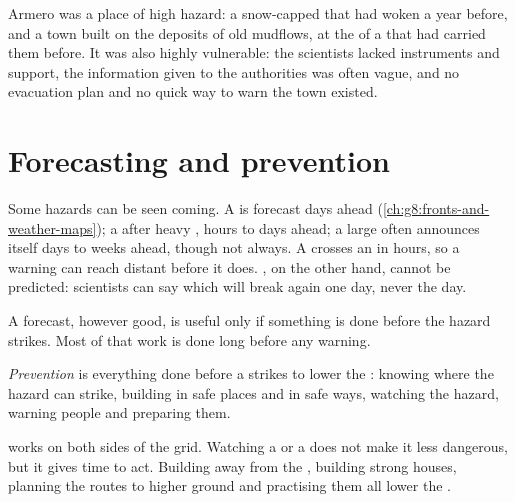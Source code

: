 Armero was a place of high hazard: a snow-capped  that had woken a
year before, and a town built on the deposits of old mudflows, at the
 of a  that had carried them before. It was also highly
vulnerable: the scientists lacked instruments and support, the
information given to the authorities was often vague, and no evacuation
plan and no quick way to warn the town existed.

\section{Forecasting and prevention}

Some hazards can be seen coming. A  is forecast days ahead
(\cref{ch:g8:fronts-and-weather-maps}); a  after heavy , hours
to days ahead; a large  often announces itself days to weeks
ahead, though not always. A  crosses an  in hours, so a
warning can reach distant  before it does. , on the
other hand, cannot be predicted: scientists can say which  will
break again one day, never the day.

A forecast, however good, is useful only if something is done before the
hazard strikes. Most of that work is done long before any warning.

\begin{definition}[Prevention]\label{def:g9:natural-risks:prevention}
\emph{Prevention} is everything done before a  strikes to lower the : knowing where the hazard can strike,
building in safe places and in safe ways, watching the hazard, warning
people and preparing them.
\end{definition}

 works on both sides of the  grid. Watching a  or a
 does not make it less dangerous, but it gives time to act. Building
away from the , building strong houses, planning the routes to
higher ground and practising them all lower the .


